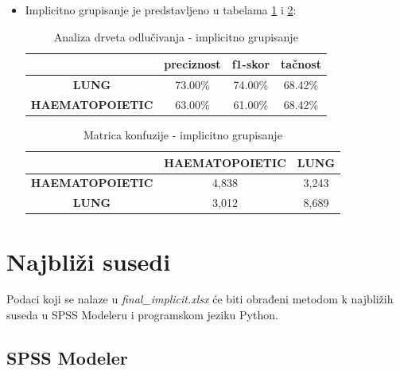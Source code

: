 \documentclass[a4paper]{article}
\begin{document}
\begin{itemize}
    \item Implicitno grupisanje je predstavljeno u tabelama \ref{tab:analiza_drveta2} i \ref{tab:konfuzija_drvo2}:
        \begin{table}[ht!]
            \begin{center}
            \caption{Analiza drveta odlučivanja - implicitno grupisanje}
            \label{tab:analiza_drveta2}
            \begin{tabular}{c|c|c|c} \hline
            & \textbf{preciznost} & \textbf{f1-skor} & \textbf{tačnost}\\ \hline
            \textbf{LUNG} & 73.00\% & 74.00\% & 68.42\%\\ \hline
            \textbf{HAEMATOPOIETIC} & 63.00\% & 61.00\% & 68.42\%\\ \hline
            \end{tabular}
            \end{center}
        \end{table}
        
         \begin{table}[ht!]
            \begin{center}
            \caption{Matrica konfuzije - implicitno grupisanje}
            \label{tab:konfuzija_drvo2}
            \begin{tabular}{c|c|c} \hline
            & \textbf{HAEMATOPOIETIC} & \textbf{LUNG}\\ \hline
            \textbf{HAEMATOPOIETIC} & 4,838 & 3,243\\ \hline
            \textbf{LUNG} & 3,012 & 8,689 \\ \hline
            \end{tabular}
            \end{center}
        \end{table}
        
    \end{itemize}

\section{Najbliži susedi}
\label{sec:knn}

Podaci koji se nalaze u \textit{final\_implicit.xlsx} će biti obrađeni metodom k najbližih suseda u SPSS Modeleru i programskom jeziku Python.

\subsection{SPSS Modeler}
\end{document}
